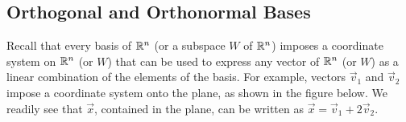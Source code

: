 \documentclass{ximera}
\begin{document}
\subsection*{Orthogonal and Orthonormal Bases}
Recall that every basis of $\mathbb{R}^n$ (or a subspace $W$ of $\mathbb{R}^n$) imposes a coordinate system on $\mathbb{R}^n$ (or $W$) that can be used to express any vector of $\mathbb{R}^n$ (or $W$) as a linear combination of the elements of the basis.  For example, vectors $\vec{v}_1$ %
and $\vec{v}_2$ %
impose a coordinate system onto the plane, as shown in the figure below.  We readily see that $\vec{x}$, contained in the plane, %
can be written as $\vec{x}=\vec{v}_1+2\vec{v}_2$.
\end{document}
